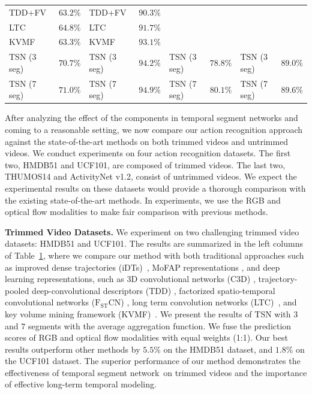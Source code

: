 \documentclass[10pt,journal,compsoc]{IEEEtran}
\newcommand{\SEGNET}{temporal segment network}
\begin{document}
\begin{table}[t!]
{\begin{tabular}{|lr|lr|lr|lr|}
    TDD+FV \cite{WangQT15a} & $ 63.2\% $ & TDD+FV \cite{WangQT15a} & $ 90.3\% $ & & & & \\
    LTC~\cite{varol} & $ 64.8\% $ & LTC~\cite{varol} & $ 91.7\% $ & & & & \\
    KVMF~\cite{ZhuW2016} & $ 63.3\% $ & KVMF~\cite{ZhuW2016} & $ 93.1\% $ & & & & \\
    \hline
    \hline
    TSN (3 seg) & $ 70.7\% $ & TSN (3 seg) & $ 94.2\% $ & TSN (3 seg) & $ 78.8\% $ & TSN (3 seg) & $ 89.0\%$ \\
    TSN (7 seg) & $ \mathbf{71.0\%} $ & TSN (7 seg) & $ \mathbf{94.9\%} $ & TSN (7 seg) & $\mathbf{80.1\%}$  & TSN (7 seg) & $ \mathbf{89.6\%} $\\
    \hline
  \end{tabular}
  }
  \label{tbl:stoa}
  \vspace{-10pt}
\end{table}


After analyzing the effect of the components in \SEGNET s and coming to a reasonable setting, we now compare our action recognition approach against the state-of-the-art methods on both trimmed videos and untrimmed videos. We conduct experiments on four action recognition datasets. The first two, HMDB51 and UCF101, are composed of trimmed videos. The last two, THUMOS14 and ActivityNet v1.2, consist of untrimmed videos. We expect the experimental results on these datasets would provide a thorough comparison with the existing state-of-the-art methods. In experiments, we use the RGB and optical flow modalities to make fair comparison with previous methods. 

{\bf Trimmed Video Datasets.}
We experiment on two challenging trimmed video datasets: HMDB51 and UCF101. The results are summarized in the left columns of Table~\ref{tbl:stoa}, where we compare our method with both traditional approaches such as improved dense trajectories (iDTs)~\cite{WangS13a}, MoFAP representations \cite{WangQT15b}, and deep learning representations, such as 3D convolutional networks (C3D) \cite{TranBFTP15}, trajectory-pooled deep-convolutional descriptors (TDD) \cite{WangQT15a}, factorized spatio-temporal convolutional networks ($\mathrm{F_{ST}CN}$) \cite{SunJYS15}, long term convolution networks (LTC)~\cite{varol}, and key volume mining framework (KVMF)~\cite{ZhuW2016}.
We present the results of TSN with $ 3 $ and $ 7 $ segments with the average aggregation function. We fuse the prediction scores of RGB and optical flow modalities with equal weights (1:1).
Our best results outperform other methods by $ 5.5\% $ on the HMDB51 dataset, and $ 1.8\% $ on the UCF101 dataset. The superior performance of our method demonstrates the effectiveness of \SEGNET~on trimmed videos and the importance of effective long-term temporal modeling.
\end{document}
